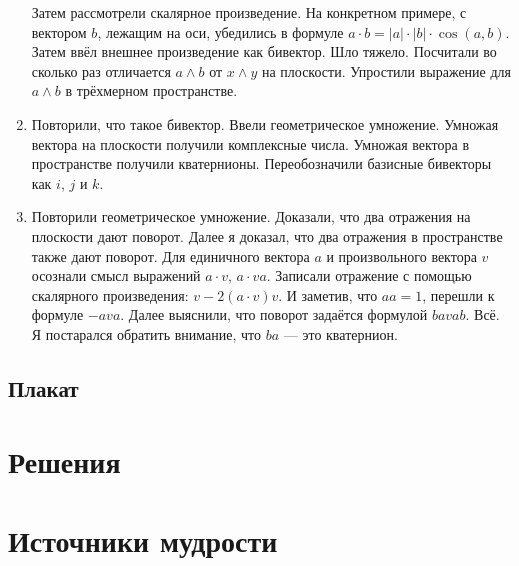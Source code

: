 \documentclass[12pt]{article}
\newcounter{problem}[section]
\theoremstyle{definition}
\begin{document}
\begin{enumerate}
  Затем рассмотрели скалярное произведение. На конкретном примере, с вектором $b$, лежащим на оси, убедились в формуле $a\cdot b = |a|\cdot |b|\cdot \cos(a, b)$.
  Затем ввёл внешнее произведение как бивектор. Шло тяжело. Посчитали во сколько раз отличается $a \wedge b$ от $x \wedge y$ на плоскости. 
  Упростили выражение для $a \wedge b$ в трёхмерном пространстве. 
  \item Повторили, что такое бивектор. Ввели геометрическое умножение. Умножая вектора на плоскости получили комплексные числа.
  Умножая вектора в пространстве получили кватернионы. Переобозначили базисные бивекторы как $i$, $j$ и $k$. 
  \item Повторили геометрическое умножение. Доказали, что два отражения на плоскости дают поворот. Далее я доказал, что два 
  отражения в пространстве также дают поворот. Для единичного вектора $a$ и произвольного вектора $v$ 
  осознали смысл выражений $a\cdot v$, $a\cdot v a$. Записали отражение с помощью скалярного произведения: $v - 2(a\cdot v)v$.
  И заметив, что $aa=1$, перешли к формуле $-ava$. Далее выяснили, что поворот задаётся формулой $bavab$. Всё.
  Я постарался обратить внимание, что $ba$ — это кватернион. 



\end{enumerate}

\subsection{Плакат}






\renewenvironment{solution}[1]{%
         \vskip .5cm plus 2cm minus 0.1cm%
         {\bfseries \hyperlink{problem:#1}{#1.}}%
}%
{%
}%



\section{Решения}



\section{Источники мудрости}

\end{document}
